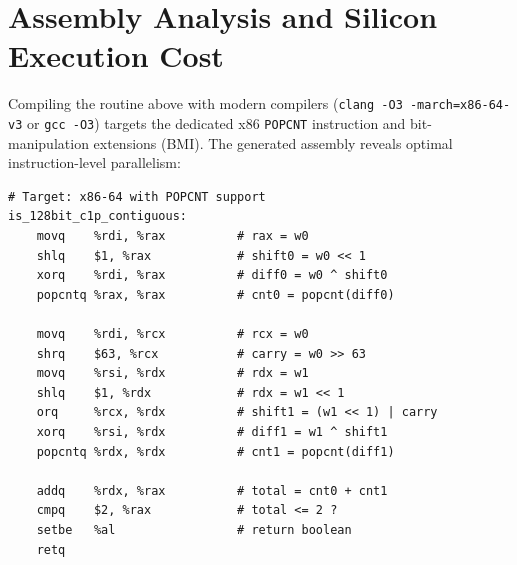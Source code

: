 \documentclass[11pt,a4paper]{article}
\theoremstyle{definition}
\begin{document}
\section{Assembly Analysis and Silicon Execution Cost}

Compiling the routine above with modern compilers (\texttt{clang -O3 -march=x86-64-v3} or \texttt{gcc -O3}) targets the dedicated x86 \texttt{POPCNT} instruction and bit-manipulation extensions (BMI). The generated assembly reveals optimal instruction-level parallelism:

\begin{lstlisting}[style=cstyle]
# Target: x86-64 with POPCNT support
is_128bit_c1p_contiguous:
    movq    %rdi, %rax          # rax = w0
    shlq    $1, %rax            # shift0 = w0 << 1
    xorq    %rdi, %rax          # diff0 = w0 ^ shift0
    popcntq %rax, %rax          # cnt0 = popcnt(diff0)
    
    movq    %rdi, %rcx          # rcx = w0
    shrq    $63, %rcx           # carry = w0 >> 63
    movq    %rsi, %rdx          # rdx = w1
    shlq    $1, %rdx            # rdx = w1 << 1
    orq     %rcx, %rdx          # shift1 = (w1 << 1) | carry
    xorq    %rsi, %rdx          # diff1 = w1 ^ shift1
    popcntq %rdx, %rdx          # cnt1 = popcnt(diff1)
    
    addq    %rdx, %rax          # total = cnt0 + cnt1
    cmpq    $2, %rax            # total <= 2 ?
    setbe   %al                 # return boolean
    retq
\end{lstlisting}

\begin{table}[h]
\centering
\caption{Silicon Cycle and Latency Budget on Modern Architectures}
\label{tab:silicon_cost}
\end{table}
\end{document}
